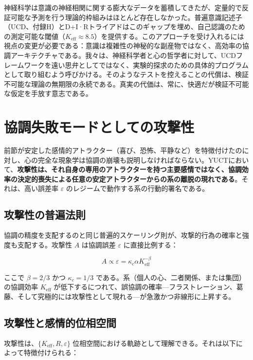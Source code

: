 \documentclass[12pt,a4paper]{article}
\begin{document}
	神経科学は意識の神経相関に関する膨大なデータを蓄積してきたが、定量的で反証可能な予測を行う理論的枠組みはほとんど存在しなかった。普遍意識記述子（UCD、付録H）とD+I·Rトライアドはこのギャップを埋め、自己認識のための測定可能な閾値（\(K_{\mathrm{eff}} \approx 8.5\)）を提供する。このアプローチを受け入れるには視点の変更が必要である：意識は複雑性の神秘的な副産物ではなく、高効率の協調アーキテクチャである。我々は、神経科学者と心の哲学者に対して、UCDフレームワークを遠い思弁としてではなく、実験的探求のための具体的プログラムとして取り組むよう呼びかける。そのようなテストを控えることの代償は、検証不可能な理論の無期限の永続である。真実の代価は、常に、快適だが検証不可能な仮定を手放す意志である。
	
	\section{協調失敗モードとしての攻撃性}
	
	前節が安定した感情的アトラクター（喜び、恐怖、平静など）を特徴付けたのに対し、心の完全な現象学は協調の崩壊も説明しなければならない。YUCTにおいて、\textbf{攻撃性は、それ自身の専用のアトラクターを持つ主要感情ではなく、協調効率の決定的喪失による任意の安定アトラクターからの系の離脱の現れである}。それは、高い誤差率 \(\varepsilon\) のレジームで動作する系の行動的署名である。
	
	\subsection{攻撃性の普遍法則}
	
	協調の精度を支配するのと同じ普遍的スケーリング則が、攻撃的行為の確率と強度も支配する。攻撃性 \(A\) は協調誤差 \(\varepsilon\) に直接比例する：
	
	\begin{equation}
		A \propto \varepsilon = \kappa_c \alpha K_{\mathrm{eff}}^{-\beta}
	\end{equation}
	
	ここで \(\beta = 2/3\) かつ \(\kappa_c = 1/3\) である。系（個人の心、二者関係、または集団）の協調効率 \(K_{\mathrm{eff}}\) が低下するにつれて、誤協調の確率—フラストレーション、葛藤、そして究極的には攻撃性として現れる—が急激かつ非線形に上昇する。
	
	\subsection{攻撃性と感情的位相空間}
	
	攻撃性は、\(\{K_{\mathrm{eff}}, R, \varepsilon\}\) 位相空間における軌跡として理解できる。それは以下によって特徴付けられる：
	
\end{document}
